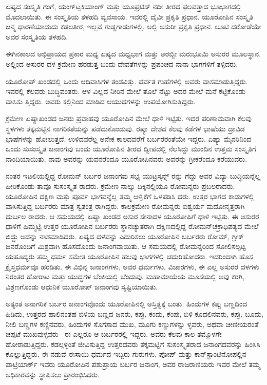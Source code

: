 ಏಷ್ಯದ ಸಂಸ್ಕೃತಿ ಗಂಗೆ, ಯಂಗ್​ಟ್ಸಕಿಯಾಂಗ್​ ಮತ್ತು ಯೂಫ್ರಟಿಸ್​ ನದೀ ತೀರದ ಫಲವತ್ತಾದ ಭೂಭಾಗದಲ್ಲಿ ಮೊದಲಾಯಿತು. ಈ ಸಂಸ್ಕೃತಿಯ ತಳಹದಿ ವ್ಯವಸಾಯ. ಇವರಲ್ಲಿ ದೈವೀ ಪ್ರಕೃತಿ ಪ್ರಧಾನ. ಯೂರೋಪಿನ ಸಂಸ್ಕೃತಿ ಜನ್ಮ ಧಾರಣೆಯಾದುದು ಕಡಲತೀರ, ಇಲ್ಲವೆ ಗುಡ್ಡಗಾಡುಗಳಲ್ಲಿ. ಅಲ್ಲಿ ಅಸುರೀ ಪ್ರಕೃತಿ ಪ್ರಧಾನ. ಲೂಟಿ ದರೋಡೆಯೇ ಅವರ ಸಂಸ್ಕೃತಿಯ ತಳಹದಿ.

ಈಗಿನಕಾಲದ ಅಭಿಪ್ರಾಯದ ಪ್ರಕಾರ ಮಧ್ಯ ಏಷ್ಯದ ಮಧ್ಯಭಾಗ ಮತ್ತು ಅರಬ್ಬೀ ಮರುಭೂಮಿ ಅಸುರರ ಮೂಲಸ್ಥಾನ. ಅಲ್ಲಿಂದ ಅಸುರರ ದಳ ಕ್ರಮೇಣ ಹರಡುತ್ತ ಬಂದು ದೇವತೆಗಳನ್ನು ಪ್ರಪಂಚದ ನಾನಾ ಭಾಗಗಳಿಗೆ ತಳ್ಳಿದರು.

ಯೂರೋಪ್​ ಖಂಡದಲ್ಲಿ ಒಂದು ಆದಿವಾಸಿಗಳ ತಂಡವಿತ್ತು. ಪರ್ವತ ಗುಹೆಗಳಲ್ಲಿ ಅವರು ವಾಸಮಾಡುತ್ತಿದ್ದರು. ಇವರಲ್ಲಿ ಕೆಲವರು ಬುದ್ಧಿವಂತರು. ಆಳ ವಿಲ್ಲದ ನೀರಿನ ಮೇಲೆ ತೊಲೆ ನೆಟ್ಟು ಅದರ ಮೇಲೆ ಮನೆ ಕಟ್ಟಿಕೊಂಡು ವಾಸಿಸು ತ್ತಿದ್ದರು. ಅವರು ಕಲ್ಲಿನಿಂದ ಮಾಡಿದ ಆಯುಧಗಳನ್ನು ಉಪಯೋಗಿಸುತ್ತಿದ್ದರು.

ಕ್ರಮೇಣ ಏಷ್ಯಾಖಂಡದ ಜನರು ಪ್ರವಾಹವು ಯೂರೋಪಿನ ಮೇಲೆ ಧಾಳಿ ಇಟ್ಟಿತು. ಇದರ ಪರಿಣಾಮವಾಗಿ ಕೆಲವು ಸ್ಥಳಗಳು ತಕ್ಕಮಟ್ಟಿನ ನಾಗರಿಕತೆಯನ್ನು ಪಡೆದುಕೊಂಡುವು. ರಷ್ಯಾ ದೇಶದ ಕೆಲವು ಕಡೆಗಳ ಭಾಷೆಯು ದ್ರಾವಿಡ ಭಾಷೆಗಳನ್ನು ಹೋಲುತ್ತದೆ. ಉಳಿದವರೆಲ್ಲ ಅನೇಕ ಕಾಲದವರೆಗೆ ಬರ್ಬರರಂತೆಯೇ ಇದ್ದರು. ಏಷ್ಯಾ ಮೈನರಿನಿಂದ ಒಂದು ಸುಸಂಸ್ಕೃತ ಜನಾಂಗವು ಬಂದು ಯೂರೋಪಿನ ತೀರದ ದ್ವೀಪದಲ್ಲಿ ನೆಲಸಿದ್ದು ಮುಂದಿನ ಉತ್ತಮ ಸಂಸ್ಕೃತಿಗೆ ನಾಂದಿಯಾಯಿತು. ನಾವು ಅವರನ್ನು ಯವನರೆಂದೂ ಯೂರೋಪಿನವರು ಅವರನ್ನು ಗ್ರೀಕರೆಂದೂ ಕರೆಯುವರು.

ನಂತರ ಇಟಲಿಯಲ್ಲಿದ್ದ ರೋಮನ್​ ಬರ್ಬರ ಜನಾಂಗವು ಸಭ್ಯ ಯುಟ್ರಸ್ಕನ್ನ್​ ರನ್ನು ಗೆದ್ದು ಅವರ ವಿದ್ಯಾ ಬುದ್ಧಿಯನ್ನೆಲ್ಲ ಹೀರಿಕೊಂಡು ತಾವೂ ಸುಸಂಸ್ಕೃತ ರಾದರು. ಕ್ರಮೇಣ ನಾಲ್ಕು ದಿಕ್ಕಿನಲ್ಲಿಯೂ ರೋಮನ್ನರು ಪ್ರಬಲರಾದರು. ಯೂರೋಪಿನ ದಕ್ಷಿಣ ಮತ್ತು ಪೂರ್ವ ಭಾಗವನ್ನೆಲ್ಲ ತಮ್ಮ ಆಳ್ವಿಕೆಗೆ ಒಳಪಡಿಸಿ ದರು. ಉತ್ತರ ಭಾಗದ ಕಾಡುಗಳಲ್ಲಿ ವಾಸಿಸುತ್ತಿದ್ದ ಬರ್ಬರರು ಮಾತ್ರ ಸ್ವತಂತ್ರ ರಾಗಿದ್ದರು. ಕಾಲಕ್ರಮೇಣ ರೋಮನ್ನರು ಐಶ್ವರ್ಯ ಮದೋನ್ಮತ್ತರಾಗಿ ದುರ್ಬಲ ರಾದರು. ಆ ಸಮಯದಲ್ಲಿ ಏಷ್ಯಾ ಖಂಡದ ಅಸುರ ಸೇನಾದಳ ಯೂರೋಪಿಗೆ ಧಾಳಿ ಇಟ್ಟಿತು. ಈ ಅಸುರರ ಧಾಳಿಗೆ ಹಿಮ್ಮಟ್ಟಿ ಉತ್ತರ ಯೂರೋಪಿನ ಬರ್ಬರರು ಸ್ಥಾನಚ್ಯುತರಾಗಿ ದಕ್ಷಿಣದಲ್ಲಿದ್ದ ರೋಮನ್​ ಚಕ್ರಾಧಿಪತ್ಯದ ಮೇಲೆ ಬಿದ್ದು ಅದನ್ನು ನಾಶಮಾಡಿದರು. ಏಷ್ಯದ ದಳವನ್ನು ಎದುರಿಸಲು ಯೂರೋಪಿನ ಬರ್ಬರರು ರೋಮ್​, ಗ್ರೀಕ್​ ಜನರೊಂದಿಗೆ ಮಿಶ್ರವಾಗಿ ಹೊಸದೊಂದು ಜನಾಂಗವಾಯಿತು. ಆ ಸಮಯದಲ್ಲಿ ರೋಮನ್ನರಿಂದ ಸೋಲಿಸಲ್ಪಟ್ಟ ಯಹೂದ್ಯರು ತಮ್ಮ ಧರ್ಮ ಸಮೇತ ಯೂರೋಪಿನ ಹಲವು ಭಾಗಗಳಲ್ಲಿ ಚದುರಿಹೋದರು. ಇದರಿಂದಾಗಿ ಹೊಸ ಕ್ರೈಸ್ತಧರ್ಮವೂ ಹರಡಿತು. ಈ ವಿಭಿನ್ನ ಜನಾಂಗಗಳು, ಅವರ ಧರ್ಮಗಳು, ವಿಚಾರಗಳು, ಈ ಎಲ್ಲ ಅಸುರರ ದಳಗಳು ನಿರಂತರ ಹೋರಾಟ ಮತ್ತು ಯುದ್ಧಗಳ ಬೆಂಕಿಯಲ್ಲಿ ಬೆಂದುವು. ಮಹಾಮಾಯೆಯ ಮೂಸೆಯಲ್ಲಿ ಅವು ಕರಗಿ, ವಿಶ್ರಣಗೊಂಡು ಆಧುನಿಕ ಯೂರೋಪ್​ ಜನಾಂಗವು ಸೃಷ್ಟಿಯಾಯಿತು.

ಅತ್ಯಂತ ಅನಾಗರಿಕ ಬರ್ಬರ ಜನಾಂಗವೊಂದು ಯೂರೋಪಿನಲ್ಲಿ ಅಸ್ತಿತ್ವಕ್ಕೆ ಬಂತು. ಹಿಂದುಗಳ ಕಪ್ಪು ಬಣ್ಣದಿಂದ ಹಿಡಿದು, ಉತ್ತರದ ಹಾಲಿನಂತಹ ಬಿಳಿಯ ಬಣ್ಣದ ಜನರು, ಕಪ್ಪು, ಕಂದು, ಕೆಂಪು, ಬಿಳಿ ಕೂದಲಿನವರು, ಕಪ್ಪು, ಬೂದು, ನೀಲಿ ಬಣ್ಣಗಳ ಕಣ್ಣಿನವರು, ಹಿಂದುಗಳ ಸೊಗಸಾದ ಮುಖ, ಮೂಗು ಕಣ್ಣುಗಳನ್ನು ಳ್ಳವರು, ಅಥವಾ ಚೀಣೀಯರಂತೆ ಚಪ್ಪಟೆ ಮುಖವುಳ್ಳವರು– ಈ ಎಲ್ಲರೂ ಆ ಬರ್ಬರರಲ್ಲಿ ಇದ್ದರು. ಅವರು ಕೆಲವು ಕಾಲ ತಮ್ಮೊಳಗೇ ಹೋರಾಡುತ್ತಿದ್ದರು. ಕಡಲ್ಗಳ್ಳಂತೆ ಜೀವಿಸುತ್ತಿದ್ದ ಉತ್ತರದವರು ತಕ್ಕಮಟ್ಟಿಗೆ ಸುಸಂಸ್ಕೃತರಾದ ಜನಾಂಗದವರನ್ನು ಹಿಂಸಿಸಿ ಕೊಲ್ಲುತ್ತಿದ್ದರು. ಈ ನಡುವೆ ಈಸಾಯಿ ಧರ್ಮದ ಇಬ್ಬರು ಗುರುಗಳು, ಪೋಪ್​ ಮತ್ತು ಕಾನ್​ಸ್ಟಾಂಟಿನೋಪಲ್ಲಿನ ಪಾಟ್ರಿಯಾರ್ಕ್​ ಇವರು ಯೂರೋಪಿನ ಪಶುಪ್ರಾಯ ಬರ್ಬರ ಜನಾಂಗ, ಅವರ ರಾಜರಾಣಿಯರು ಇವರ ಮೇಲೆ ತಮ್ಮ ಅಧಿಕಾರವನ್ನು ಸ್ಥಾಪಿಸಲು ಪ್ರಾರಂಭಿಸಿದರು.

